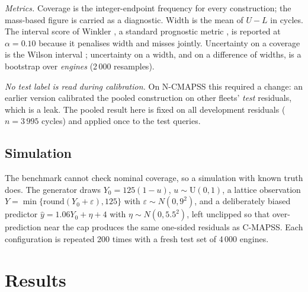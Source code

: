 \documentclass[journal]{IEEEtran}
\begin{document}
\emph{Metrics.} Coverage is the integer-endpoint frequency for every construction; the
mass-based figure is carried as a diagnostic. Width is the mean of $U-L$ in cycles. The
interval score of Winkler \cite{ginting2007}, a standard prognostic metric \cite{saxena2010},
is reported at $\alpha=0.10$ because it penalises width and misses jointly. Uncertainty on a
coverage is the Wilson interval \cite{wilson1927}; uncertainty on a width, and on a difference
of widths, is a bootstrap over \emph{engines} (2\,000 resamples).

\emph{No test label is read during calibration.} On N-CMAPSS this required a change: an
earlier version calibrated the pooled construction on other fleets' \emph{test} residuals,
which is a leak. The pooled result here is fixed on all development residuals ($n=3\,995$
cycles) and applied once to the test queries.

\subsection{Simulation}

The benchmark cannot check nominal coverage, so a simulation with known truth does. The
generator draws $Y_0=125(1-u)$, $u\sim\mathrm{U}(0,1)$, a lattice observation
$Y=\min\{\mathrm{round}(Y_0+\varepsilon),125\}$ with $\varepsilon\sim N(0,9^2)$, and a
deliberately biased predictor $\hat y=1.06Y_0+\eta+4$ with $\eta\sim N(0,5.5^2)$, left
unclipped so that over-prediction near the cap produces the same one-sided residuals as
C-MAPSS. Each configuration is repeated 200 times with a fresh test set of 4\,000 engines.

\section{Results}\label{sec:results}
\end{document}
